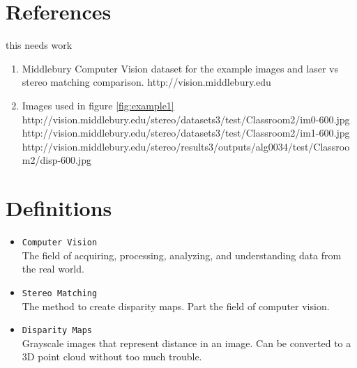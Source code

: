 \documentclass[11pt,fleqn]{article}
\begin{document}
\newpage
\begin{appendices}

\section{References}

this needs work

\begin{enumerate}

\item Middlebury Computer Vision dataset for the example images and laser vs stereo matching comparison.  
\small
http://vision.middlebury.edu
\normalsize

\item Images used in figure \ref{fig:example1}\\  
\small
http://vision.middlebury.edu/stereo/datasets3/test/Classroom2/im0-600.jpg\\
http://vision.middlebury.edu/stereo/datasets3/test/Classroom2/im1-600.jpg\\
http://vision.middlebury.edu/stereo/results3/outputs/alg0034/test/Classroom2/disp-600.jpg
\normalsize

\end{enumerate}


\section{Definitions}
\begin{itemize}
\item \texttt{Computer Vision}\\[2pt]
The field of acquiring, processing, analyzing, and understanding data from the real world.

\item \texttt{Stereo Matching}\\[2pt]
The method to create disparity maps. Part the field of computer vision.

\item \texttt{Disparity Maps}\\[2pt]
Grayscale images that represent distance in an image. Can be converted to a 3D point cloud without too much trouble.
\end{itemize}

\end{appendices}
\end{document}
